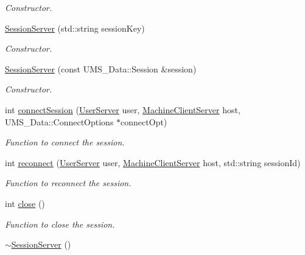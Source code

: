 \begin{DoxyCompactItemize}
\begin{DoxyCompactList}\small\item\em Constructor. \item\end{DoxyCompactList}\item 
\hyperlink{classSessionServer_ab08e4536bb4721e4f0134c60cce12f91}{SessionServer} (std::string sessionKey)
\begin{DoxyCompactList}\small\item\em Constructor. \item\end{DoxyCompactList}\item 
\hyperlink{classSessionServer_aecde9b72364184948e1a0ebdb747d52c}{SessionServer} (const UMS\_\-Data::Session \&session)
\begin{DoxyCompactList}\small\item\em Constructor. \item\end{DoxyCompactList}\item 
int \hyperlink{classSessionServer_a6ef9ca5f9b6613aa9dd8ad072efafccc}{connectSession} (\hyperlink{classUserServer}{UserServer} user, \hyperlink{classMachineClientServer}{MachineClientServer} host, UMS\_\-Data::ConnectOptions $\ast$connectOpt)
\begin{DoxyCompactList}\small\item\em Function to connect the session. \item\end{DoxyCompactList}\item 
int \hyperlink{classSessionServer_a01efa9d1722806ededc76da544590b88}{reconnect} (\hyperlink{classUserServer}{UserServer} user, \hyperlink{classMachineClientServer}{MachineClientServer} host, std::string sessionId)
\begin{DoxyCompactList}\small\item\em Function to reconnect the session. \item\end{DoxyCompactList}\item 
int \hyperlink{classSessionServer_a988e014536e580c59c920bc55d201f24}{close} ()
\begin{DoxyCompactList}\small\item\em Function to close the session. \item\end{DoxyCompactList}\item 
\hypertarget{classSessionServer_aa5d1074c861360c8052a2f523f47b8f8}{
\hyperlink{classSessionServer_aa5d1074c861360c8052a2f523f47b8f8}{$\sim$SessionServer} ()}
\label{classSessionServer_aa5d1074c861360c8052a2f523f47b8f8}


\end{DoxyCompactItemize}
